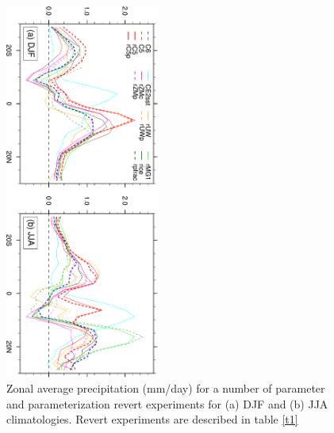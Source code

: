 \clearpage
\begin{figure}[t]
  \begin{center}
    \includegraphics[width=0.45\textwidth,angle=90.]{./figs/f_revert_PRECT_1D.pdf}
  \end{center}
  \caption{Zonal average precipitation (mm/day) for a number of parameter and parameterization revert experiments for (a) DJF and (b) JJA climatologies. Revert experiments are described in table \ref{t1}} 
\label{f_revert_PRECT_1D}
\end{figure} 

